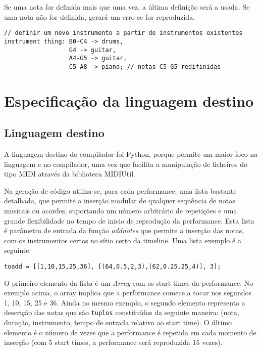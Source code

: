 \documentclass{article}
\begin{document}
Se uma nota for definida mais que uma vez, a última definição será a usada. Se uma nota não for definida, gerará um erro se for reproduzida.
\begin{lstlisting} 
// definir um novo instrumento a partir de instrumentos existentes
instrument thing: B0-C4 -> drums,
                  G4 -> guitar,
                  A4-G5 -> guitar, 
                  C5-A8 -> piano; // notas C5-G5 redifinidas
\end{lstlisting}


\section{Especificação da linguagem destino} \label{target}
\subsection{Linguagem destino}
A linguagem destino do compilador foi Python, porque permite um maior foco na linguagem e no compilador, uma vez que facilita a manipulação de ficheiros do tipo MIDI através da biblioteca MIDIUtil.

Na geração de código utiliza-se, para cada performance, uma lista bastante detalhada, que permite a inserção modular de qualquer sequência de notas musicais ou acordes, suportando um número arbitrário de repetições e uma grande flexibilidade no tempo de inicio de reprodução da performance. Esta lista é parâmetro de entrada da função \textit{addnotes} que permite a inserção das notas, com os instrumentos certos no sítio certo da timeline. Uma lista exemplo é a seguinte:

\begin{lstlisting}
toadd = [[1,10,15,25,36], [(64,0.5,2,3),(62,0.25,25,4)], 3];
\end{lstlisting}

O primeiro elemento da lista é um \textit{Array} com os start times da performance. No exemplo acima, o array implica que a performance comece a tocar nos segundos 1, 10, 15, 25 e 36. Ainda no mesmo exemplo, o segundo elemento representa a descrição das notas que são \texttt{tuplos} constituídos da seguinte maneira: (nota, duração, instrumento, tempo de entrada relativo ao start time). O último elemento é o número de vezes que a performance é repetida em cada momento de inserção (com 5 start times, a performance será reproduzida 15 vezes).
\end{document}
